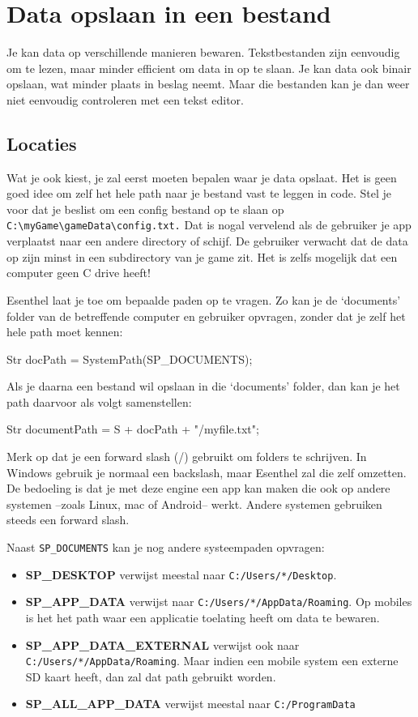 \chapter{Data opslaan in een bestand}
Je kan data op verschillende manieren bewaren. Tekstbestanden zijn eenvoudig om te lezen, maar minder efficient om data in op te slaan. Je kan data ook binair opslaan, wat minder plaats in beslag neemt. Maar die bestanden kan je dan weer niet eenvoudig controleren met een tekst editor.

\section{Locaties}
Wat je ook kiest, je zal eerst moeten bepalen waar je data opslaat. Het is geen goed idee om zelf het hele path naar je bestand vast te leggen in code. Stel je voor dat je beslist om een config bestand op te slaan op \verb|C:\myGame\gameData\config.txt.| Dat is nogal vervelend als de gebruiker je app verplaatst naar een andere directory of schijf. De gebruiker verwacht dat de data op zijn minst in een subdirectory van je game zit. Het is zelfs mogelijk dat een computer geen C drive heeft!

Esenthel laat je toe om bepaalde paden op te vragen. Zo kan je de `documents' folder van de betreffende computer en gebruiker opvragen, zonder dat je zelf het hele path moet kennen:

\begin{code}
Str docPath = SystemPath(SP_DOCUMENTS);
\end{code}

Als je daarna een bestand wil opslaan in die `documents' folder, dan kan je het path daarvoor als volgt samenstellen:

\begin{code}
Str documentPath = S + docPath + "/myfile.txt";
\end{code} 

\begin{note}
Merk op dat je een forward slash (/) gebruikt om folders te schrijven. In Windows gebruik je normaal een backslash, maar Esenthel zal die zelf omzetten. De bedoeling is dat je met deze engine een app kan maken die ook op andere systemen --zoals Linux, mac of Android-- werkt. Andere systemen gebruiken steeds een forward slash.
\end{note}

Naast \verb|SP_DOCUMENTS| kan je nog andere systeempaden opvragen:

\begin{itemize}
\item \textbf{SP\_DESKTOP} verwijst meestal naar \verb|C:/Users/*/Desktop|.
\item \textbf{SP\_APP\_DATA} verwijst naar \verb|C:/Users/*/AppData/Roaming|. Op mobiles is het het path waar een applicatie toelating heeft om data te bewaren.
\item \textbf{SP\_APP\_DATA\_EXTERNAL} verwijst ook  naar \verb|C:/Users/*/AppData/Roaming|. Maar indien een mobile system een externe SD kaart heeft, dan zal dat path gebruikt worden.
\item \textbf{SP\_ALL\_APP\_DATA} verwijst meestal naar \verb|C:/ProgramData|
\end{itemize}

